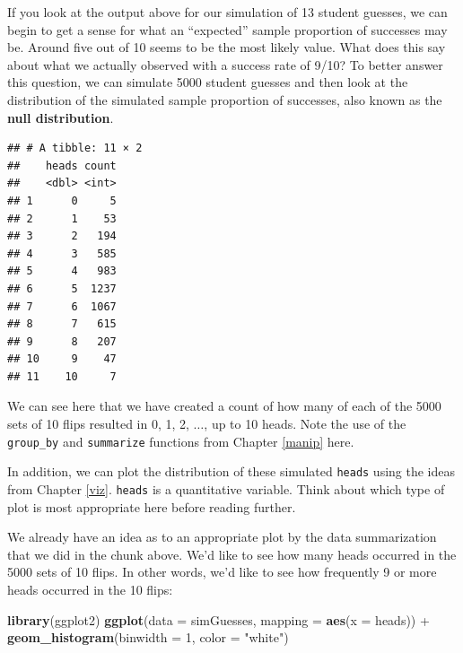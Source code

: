 \documentclass[]{tufte-book}
\newenvironment{Shaded}{\begin{snugshade}}{\end{snugshade}}
\newcommand{\KeywordTok}[1]{\textcolor[rgb]{0.13,0.29,0.53}{\textbf{{#1}}}}
\newcommand{\DataTypeTok}[1]{\textcolor[rgb]{0.13,0.29,0.53}{{#1}}}
\newcommand{\DecValTok}[1]{\textcolor[rgb]{0.00,0.00,0.81}{{#1}}}
\newcommand{\StringTok}[1]{\textcolor[rgb]{0.31,0.60,0.02}{{#1}}}
\newcommand{\NormalTok}[1]{{#1}}
\begin{document}
If you look at the output above for our simulation of 13 student
guesses, we can begin to get a sense for what an ``expected'' sample
proportion of successes may be. Around five out of 10 seems to be the
most likely value. What does this say about what we actually observed
with a success rate of 9/10? To better answer this question, we can
simulate 5000 student guesses and then look at the distribution of the
simulated sample proportion of successes, also known as the \textbf{null
distribution}.

\begin{Shaded}
\end{Shaded}

\begin{verbatim}
## # A tibble: 11 × 2
##    heads count
##    <dbl> <int>
## 1      0     5
## 2      1    53
## 3      2   194
## 4      3   585
## 5      4   983
## 6      5  1237
## 7      6  1067
## 8      7   615
## 9      8   207
## 10     9    47
## 11    10     7
\end{verbatim}

We can see here that we have created a count of how many of each of the
5000 sets of 10 flips resulted in 0, 1, 2, \(\ldots\), up to 10 heads.
Note the use of the \texttt{group\_by} and \texttt{summarize} functions
from Chapter \ref{manip} here.

In addition, we can plot the distribution of these simulated
\texttt{heads} using the ideas from Chapter \ref{viz}. \texttt{heads} is
a quantitative variable. Think about which type of plot is most
appropriate here before reading further.

We already have an idea as to an appropriate plot by the data
summarization that we did in the chunk above. We'd like to see how many
heads occurred in the 5000 sets of 10 flips. In other words, we'd like
to see how frequently 9 or more heads occurred in the 10 flips:

\begin{Shaded}
\begin{Highlighting}[]
\KeywordTok{library}\NormalTok{(ggplot2)}
\KeywordTok{ggplot}\NormalTok{(}\DataTypeTok{data =} \NormalTok{simGuesses, }\DataTypeTok{mapping =} \KeywordTok{aes}\NormalTok{(}\DataTypeTok{x =} \NormalTok{heads)) +}
\StringTok{  }\KeywordTok{geom_histogram}\NormalTok{(}\DataTypeTok{binwidth =} \DecValTok{1}\NormalTok{, }\DataTypeTok{color =} \StringTok{"white"}\NormalTok{)}
\end{Highlighting}
\end{Shaded}
\end{document}
